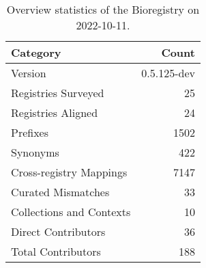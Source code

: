 \begin{table}
\centering
\caption{Overview statistics of the Bioregistry on 2022-10-11.}
\label{tab:bioregistry-summary}
\begin{tabular}{lr}
\toprule
                Category &       Count \\
\midrule
                 Version & 0.5.125-dev \\
     Registries Surveyed &          25 \\
      Registries Aligned &          24 \\
                Prefixes &        1502 \\
                Synonyms &         422 \\
 Cross-registry Mappings &        7147 \\
      Curated Mismatches &          33 \\
Collections and Contexts &          10 \\
     Direct Contributors &          36 \\
      Total Contributors &         188 \\
\bottomrule
\end{tabular}
\end{table}
